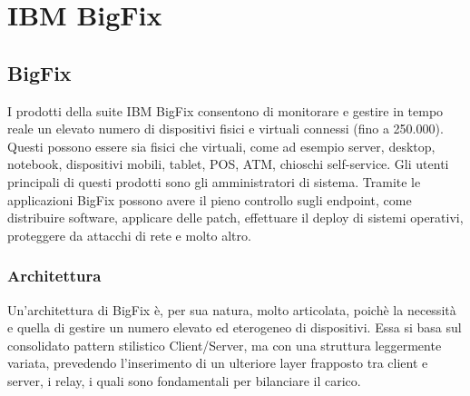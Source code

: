 \chapter{IBM BigFix}

\section{BigFix}
I prodotti della suite IBM BigFix consentono di monitorare e gestire in tempo reale un elevato numero di dispositivi fisici e virtuali connessi (fino a 250.000). Questi possono essere sia fisici che virtuali, come ad esempio server, desktop, notebook, dispositivi mobili, tablet, POS, ATM, chioschi self-service. Gli utenti principali di questi prodotti sono gli amministratori di sistema. Tramite le applicazioni BigFix possono avere il pieno controllo sugli endpoint, come distribuire software, applicare delle patch, effettuare il deploy di sistemi operativi, proteggere da attacchi di rete e molto altro.
\subsection{Architettura}
Un'architettura di BigFix è, per sua natura, molto articolata, poichè la necessità e quella di gestire un numero elevato ed eterogeneo di dispositivi. Essa si basa sul consolidato pattern stilistico Client/Server, ma con una struttura leggermente variata, prevedendo l'inserimento di un ulteriore layer frapposto tra client e server, i relay, i quali sono fondamentali per bilanciare il carico.
